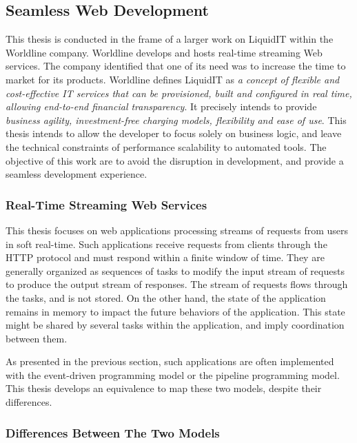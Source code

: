 \subsection{Seamless Web Development}

This thesis is conducted in the frame of a larger work on LiquidIT within the Worldline company.
Worldline develops and hosts real-time streaming Web services.
The company identified that one of its need was to increase the time to market for its products.
Worldline defines LiquidIT as \textit{a concept of flexible and cost-effective IT services that can be provisioned, built and configured in real time, allowing end-to-end financial transparency}.
It precisely intends to provide \textit{business agility, investment-free charging models, flexibility and ease of use}.
This thesis intends to allow the developer to focus solely on business logic, and leave the technical constraints of performance scalability to automated tools.
The objective of this work are to avoid the disruption in development, and provide a seamless development experience.

\subsubsection{Real-Time Streaming Web Services}

This thesis focuses on web applications processing streams of requests from users in soft real-time.
Such applications receive requests from clients through the HTTP protocol and must respond within a finite window of time.
They are generally organized as sequences of tasks to modify the input stream of requests to produce the output stream of responses.
The stream of requests flows through the tasks, and is not stored.
On the other hand, the state of the application remains in memory to impact the future behaviors of the application.
This state might be shared by several tasks within the application, and imply coordination between them.

As presented in the previous section, such applications are often implemented with the event-driven programming model or the pipeline programming model.
This thesis develops an equivalence to map these two models, despite their differences.

\subsubsection{Differences Between The Two Models}

